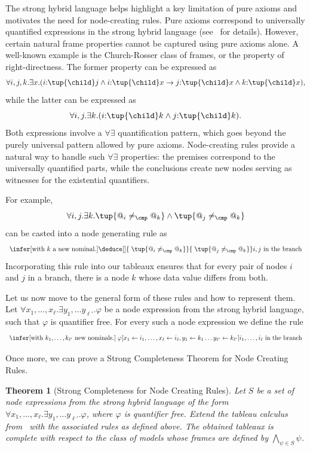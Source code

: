 \documentclass[10pt,a4paper]{amsart}
\newtheorem{thm}{Theorem}[section]
\theoremstyle{definition}
\theoremstyle{remark}
\begin{document}
The strong hybrid language helps highlight a key limitation of pure axioms and motivates the need for node-creating rules. Pure axioms correspond to universally quantified expressions in the strong hybrid language (see~\cite[Prop.~3.2]{Blackburn2002BeyondPA} for details). However, certain natural frame properties cannot be captured using pure axioms alone.
A well-known example is the Church-Rosser class of frames, or the property of right-directness. The former property can be expressed as 
\[
    \forall i,j,k.\exists x. (i{:}\tup{\child} j \land  i{:}\tup{\child}x \to j{:}\tup{\child}x \land k{:}\tup{\child}x),
\]
while the latter can be expressed as
\[
    \forall i,j.\exists k. (i{:}\tup{\child} k \land j{:}\tup{\child} k).
\]
Both expressions involve a $\forall\exists$ quantification pattern, which goes beyond the purely universal pattern allowed by pure axioms. Node-creating rules provide a natural way to handle such $\forall\exists$ properties: the premises correspond to the universally quantified parts, while the conclusions create new nodes serving as witnesses for the existential quantifiers.

For example,
\[
\forall i,j.\exists k. \tup{@_i\neq_\cmp @_k}\land\tup{@_j\neq_\cmp @_k}
\]
can be casted into a node generating rule as
\[
\begin{array}{c}
{\infer[\text{with $k$ a new nominal.}]
{
\deduce[]
{\phantom{|} {\tup{@_i\neq_\cmp @_k}}}    
{\phantom{|}{\tup{@_j\neq_\cmp @_k}}}}
{\text{$i,j$ in the branch}
}
}
\end{array}
\]
Incorporating this rule into our tableaux ensures that for every pair of nodes $i$ and $j$ in a branch, there is a node $k$ whose data value differs from both.

Let us now move to the general form of these rules and how to represent them. Let $\forall x_1,\ldots,x_\ell.\exists y_1,\ldots y_{\ell'}.\varphi$ be a node expression from the strong hybrid language, such that $\varphi$ is quantifier free. For every such a node expression we define the rule  
\[
\begin{array}{c}
{\infer[\text{with $k_1,\ldots,k_{\ell'}$ new nominals.}]
{
\phantom{|} {\varphi[x_1 \leftarrow i_1,\ldots,x_\ell \leftarrow i_\ell, y_1\leftarrow k_1\ldots y_{\ell'}\leftarrow k_{\ell'}]}}
{\text{$i_1,\ldots,i_{\ell}$ in the branch}}
}
\end{array}
\]

Once more, we can prove a Strong Completeness Theorem for Node Creating Rules.

\begin{thm}[Strong Completeness for Node Creating Rules]
    Let $S$ be a set of node expressions from the strong hybrid language of the form $\forall x_1,\ldots,x_\ell.\exists y_1,\ldots y_{\ell'}.\varphi$, where $\varphi$ is quantifier free.
    Extend the tableau calculus from~ with the associated rules as defined above. The obtained tableaux is complete with respect to the class of models whose frames are defined by $\bigwedge_{\psi\in S} \psi$.
\end{thm}
\end{document}
